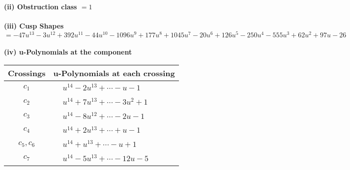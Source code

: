 \documentclass[1p]{elsarticle_modified}
\theoremstyle{definition}
\begin{document}
\flushleft \textbf{(ii) Obstruction class $= 1$}\\~\\
\flushleft \textbf{(iii) Cusp Shapes $= -47 u^{13}-3 u^{12}+392 u^{11}-44 u^{10}-1096 u^9+177 u^8+1045 u^7-20 u^6+126 u^5-250 u^4-555 u^3+62 u^2+97 u-26$}\\~\\
\newpage\renewcommand{\arraystretch}{1}
\flushleft \textbf{(iv) u-Polynomials at the component}\newline \\
\begin{tabular}{m{50pt}|m{274pt}}
Crossings & \hspace{64pt}u-Polynomials at each crossing \\
\hline $$\begin{aligned}c_{1}\end{aligned}$$&$\begin{aligned}
&u^{14}-2 u^{13}+\cdots- u-1
\end{aligned}$\\
\hline $$\begin{aligned}c_{2}\end{aligned}$$&$\begin{aligned}
&u^{14}+7 u^{13}+\cdots-3 u^2+1
\end{aligned}$\\
\hline $$\begin{aligned}c_{3}\end{aligned}$$&$\begin{aligned}
&u^{14}-8 u^{12}+\cdots-2 u-1
\end{aligned}$\\
\hline $$\begin{aligned}c_{4}\end{aligned}$$&$\begin{aligned}
&u^{14}+2 u^{13}+\cdots+u-1
\end{aligned}$\\
\hline $$\begin{aligned}c_{5},c_{6}\end{aligned}$$&$\begin{aligned}
&u^{14}+u^{13}+\cdots- u+1
\end{aligned}$\\
\hline $$\begin{aligned}c_{7}\end{aligned}$$&$\begin{aligned}
&u^{14}-5 u^{13}+\cdots-12 u-5
\end{aligned}$\\

\end{tabular}
\end{document}
